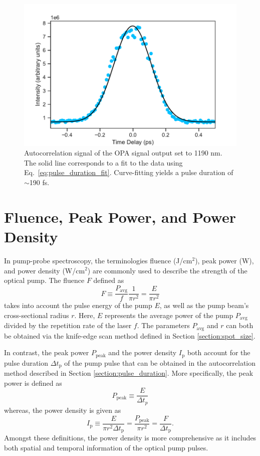 \begin{figure}[ht]
	\centering
	\includegraphics[scale=0.6]{images/chapter_methods/opa_pump_autocorr}
		\caption{Autocorrelation signal of the OPA signal output set to 1190 nm. The solid line corresponds to a fit to the data using Eq.\ \eqref{eq:pulse_duration_fit}. Curve-fitting yields a pulse duration of $\sim$190 fs.}
		\label{fig:opa_autocorr}
\end{figure}

\section{Fluence, Peak Power, and Power Density}
In pump-probe spectroscopy, the terminologies fluence (J/cm$^2$), peak power (W), and power density (W/cm$^2$) are commonly used to describe the strength of the optical pump. The fluence $F$ defined as
\begin{equation}
	F \equiv \dfrac{P_\text{avg}}{f} \dfrac{1}{\pi r^2} = \dfrac{E}{\pi r^2}
\end{equation}
takes into account the pulse energy of the pump $E$, as well as the pump beam's cross-sectional radius $r$. Here, $E$ represents the average power of the pump $P_\text{avg}$ divided by the repetition rate of the laser $f$. The parameters $P_\text{avg}$ and $r$ can both be obtained via the knife-edge scan method defined in Section \ref{section:spot_size}.

In contrast, the peak power $P_\text{peak}$ and the power density $I_\text{p}$ both account for the pulse duration $\Delta t_\text{p}$ of the pump pulse that can be obtained in the autocorrelation method described in Section \ref{section:pulse_duration}. More specifically, the peak power is defined as
\begin{equation}
	P_\text{peak} \equiv \dfrac{E}{\Delta t_p}
\end{equation}
whereas, the power density is given as
\begin{equation}
	I_\text{p} \equiv \dfrac{E}{\pi r^2 \Delta t_\text{p}} = \dfrac{P_\text{peak}}{\pi r^2} =\dfrac{F}{\Delta t_\text{p}}.
\end{equation}
Amongst these definitions, the power density is more comprehensive as it includes both spatial and temporal information of the optical pump pulses.
